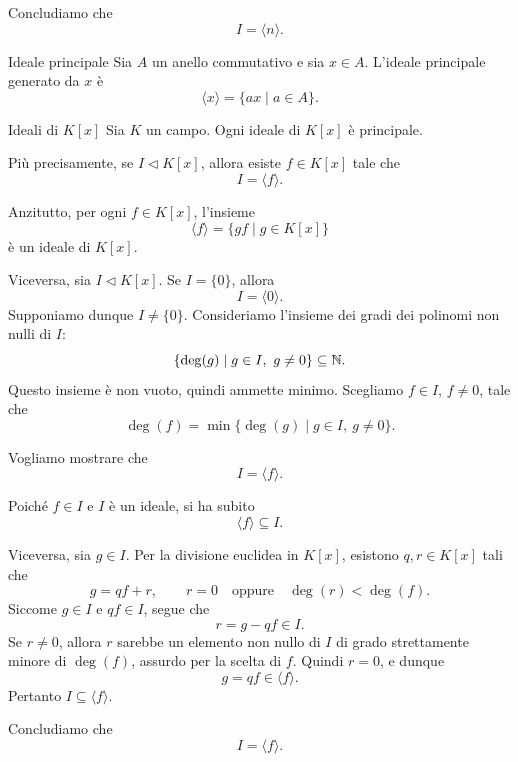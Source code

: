 \documentclass[a4paper]{article}
\begin{document}
\begin{radioactive}
\begin{snippetproof}{}
    Concludiamo che
    \[
        I=\langle n \rangle.
    \]
\end{snippetproof}
\end{radioactive}

\begin{radioactive}
\begin{snippetdefinition}{Ideale principale}
    Sia \(A\) un anello commutativo e sia \(x \in A\).
    L'ideale principale generato da \(x\) è
    \[
        \langle x \rangle=\{ax \mid a \in A\}.
    \]
\end{snippetdefinition}
\end{radioactive}

\begin{radioactive}
\begin{snippetproposition}{Ideali di \(K[x]\)}
    Sia \(K\) un campo. Ogni ideale di \(K[x]\) è principale.

    Più precisamente, se \(I \triangleleft K[x]\), allora esiste \(f \in K[x]\) tale che
    \[
        I=\langle f \rangle.
    \]
\end{snippetproposition}
\end{radioactive}

\begin{radioactive}
\begin{snippetproof}{}
    Anzitutto, per ogni \(f \in K[x]\), l'insieme
    \[
        \langle f \rangle=\{gf \mid g \in K[x]\}
    \]
    è un ideale di \(K[x]\).

    Viceversa, sia \(I \triangleleft K[x]\). Se \(I=\{0\}\), allora
    \[
        I=\langle 0 \rangle.
    \]
    Supponiamo dunque \(I\neq \{0\}\). Consideriamo l'insieme dei gradi dei polinomi non nulli di \(I\):
    \[
        \{\deg(g) \mid g \in I,\ g\neq 0\}\subseteq \mathbb{N}.
    \]
    Questo insieme è non vuoto, quindi ammette minimo.
    Scegliamo \(f \in I\), \(f\neq 0\), tale che
    \[
        \deg(f)
        =
        \min\{\deg(g) \mid g \in I,\ g\neq 0\}.
    \]

    Vogliamo mostrare che
    \[
        I=\langle f \rangle.
    \]

    Poiché \(f \in I\) e \(I\) è un ideale, si ha subito
    \[
        \langle f \rangle\subseteq I.
    \]

    Viceversa, sia \(g \in I\). Per la divisione euclidea in \(K[x]\), esistono \(q,r \in K[x]\) tali che
    \[
        g=qf+r,
        \qquad
        r=0
        \quad
        \text{oppure}
        \quad
        \deg(r)<\deg(f).
    \]
    Siccome \(g \in I\) e \(qf \in I\), segue che
    \[
        r=g-qf \in I.
    \]
    Se \(r\neq 0\), allora \(r\) sarebbe un elemento non nullo di \(I\) di grado strettamente minore di \(\deg(f)\), assurdo per la scelta di \(f\).
    Quindi \(r=0\), e dunque
    \[
        g=qf \in \langle f \rangle.
    \]
    Pertanto \(I\subseteq \langle f \rangle\).

    Concludiamo che
    \[
        I=\langle f \rangle.
    \]
\end{snippetproof}
\end{radioactive}
\end{document}
